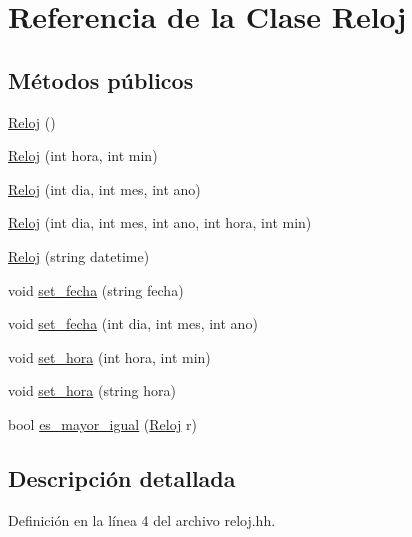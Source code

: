 \hypertarget{class_reloj}{\section{Referencia de la Clase Reloj}
\label{class_reloj}
}
\subsection*{Métodos públicos}
\begin{DoxyCompactItemize}
\item 
\hyperlink{class_reloj_a0966eaa7e7079419049e683bafa7dbc0}{Reloj} ()
\item 
\hyperlink{class_reloj_a50372eb792bbc0c12ad2e90bcee7ab3b}{Reloj} (int hora, int min)
\item 
\hyperlink{class_reloj_a95686566de93f19f9d274a41af07e66f}{Reloj} (int dia, int mes, int ano)
\item 
\hyperlink{class_reloj_a3b03a5374564eb6cc1f4859a2d2412ee}{Reloj} (int dia, int mes, int ano, int hora, int min)
\item 
\hyperlink{class_reloj_abd5471a9cf91118d40c9efaab89a9a76}{Reloj} (string datetime)
\item 
void \hyperlink{class_reloj_a7afa0f35262ba2258a12b5cd739c0eca}{set\-\_\-fecha} (string fecha)
\item 
void \hyperlink{class_reloj_ab68ba5bb16bfa84983413d07b7ddc26a}{set\-\_\-fecha} (int dia, int mes, int ano)
\item 
void \hyperlink{class_reloj_a644b36309ac37e113bf804321d5629dd}{set\-\_\-hora} (int hora, int min)
\item 
void \hyperlink{class_reloj_a7b5fc5e3390362e1a7bc8563a64dbfe8}{set\-\_\-hora} (string hora)
\item 
bool \hyperlink{class_reloj_a19b46984dcaef6189b699992a0e9a0e7}{es\-\_\-mayor\-\_\-igual} (\hyperlink{class_reloj}{Reloj} r)
\end{DoxyCompactItemize}


\subsection{Descripción detallada}


Definición en la línea 4 del archivo reloj.\-hh.



